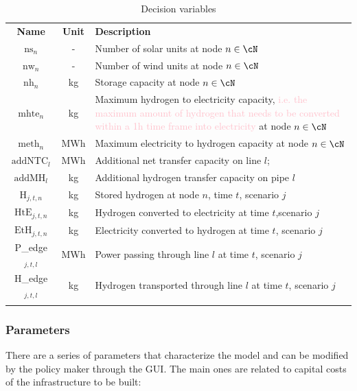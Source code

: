 \begin{table}
  \caption{Decision variables}
  \label{table_vars}       %
  \begin{tabularx}{\textwidth}{ccl}
  \hline\noalign{\smallskip}
  \textbf{Name} & \textbf{Unit} & \textbf{Description}  \\
  \noalign{\smallskip}\hline\noalign{\smallskip}
  $\text{ns}_n$ & - & Number of solar units at node $n \in \cN$ \\
  $\text{nw}_n$ & - & Number of wind units at node $n \in \cN$ \\
  $\text{nh}_n$ & kg & Storage capacity at node $n \in \cN$\\
  $\text{mhte}_n$ & kg & \parbox[t]{0.70\textwidth}{Maximum hydrogen to electricity capacity, \textcolor{pink}{i.e. the maximum amount of hydrogen that needs to be converted within a 1h time frame into electricity} at node $n \in \cN$} \\
  $\text{meth}_n$ & MWh & Maximum electricity to hydrogen capacity at node $n \in \cN$\\
  $\text{addNTC}_l$ & MWh & Additional net transfer capacity on line $l$;\\
  $\text{addMH}_l$ & kg & Additional hydrogen transfer capacity on pipe $l$\\
  \noalign{\smallskip}\hline\noalign{\smallskip}
  $\text{H}_{j,t,n}$ & kg& Stored hydrogen at node $n$, time \(t\), scenario \(j\)\\
  $\text{HtE}_{j,t,n}$ & kg& Hydrogen converted to electricity at time \(t\),scenario \(j\) \\
  $\text{EtH}_{j,t,n}$ & kg& Electricity converted to hydrogen at time \(t\), scenario \(j\)\\
  P\_edge$_{j,t,l}$&MWh& Power passing through line $l$ at time $t$, scenario $j$ \\
  H\_edge$_{j,t,l}$&kg& Hydrogen transported through line $l$ at time $t$, scenario $j$\\
  \noalign{\smallskip}\hline
  \end{tabularx}
  \end{table}
  



\subsubsection{Parameters}
\color{gray}
There are a series of parameters that characterize the model and can be modified by the policy maker through the GUI. The main ones are related to capital costs of the infrastructure to be built:

